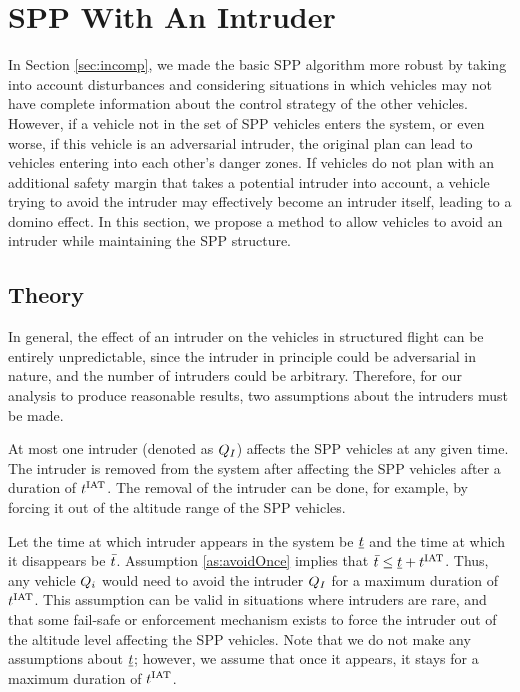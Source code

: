 \section{SPP With An Intruder \label{sec:intruder}}
In Section \ref{sec:incomp}, we made the basic SPP algorithm more robust by taking into account disturbances and considering situations in which vehicles may not have complete information about the control strategy of the other vehicles. However, if a vehicle not in the set of SPP vehicles enters the system, or even worse, if this vehicle is an adversarial intruder, the original plan can lead to vehicles entering into each other's danger zones. If vehicles do not plan with an additional safety margin that takes a potential intruder into account, a vehicle trying to avoid the intruder may effectively become an intruder itself, leading to a domino effect. In this section, we propose a method to allow vehicles to avoid an intruder while maintaining the SPP structure.

\subsection{Theory}
In general, the effect of an intruder on the vehicles in structured flight can be entirely unpredictable, since the intruder in principle could be adversarial in nature, and the number of intruders could be arbitrary. Therefore, for our analysis to produce reasonable results, two assumptions about the intruders must be made.

\begin{assumption}
\label{as:avoidOnce}
At most one intruder (denoted as $Q_I$) affects the SPP vehicles at any given time. The intruder is removed from the system after affecting the SPP vehicles after a duration of $t^\text{IAT}$. The removal of the intruder can be done, for example, by forcing it out of the altitude range of the SPP vehicles.
\end{assumption}

Let the time at which intruder appears in the system be $\underline{t}$ and the time at which it disappears be $\bar{t}$. Assumption \ref{as:avoidOnce} implies that $\bar{t} \leq \underline{t} + t^\text{IAT}$. Thus, any vehicle $Q_i$ would need to avoid the intruder $Q_{I}$ for a maximum duration of $t^\text{IAT}$. This assumption can be valid in situations where intruders are rare, and that some fail-safe or enforcement mechanism exists to force the intruder out of the altitude level affecting the SPP vehicles. Note that we do not make any assumptions about $\underline{t}$; however, we assume that once it appears, it stays for a maximum duration of $t^\text{IAT}$.

